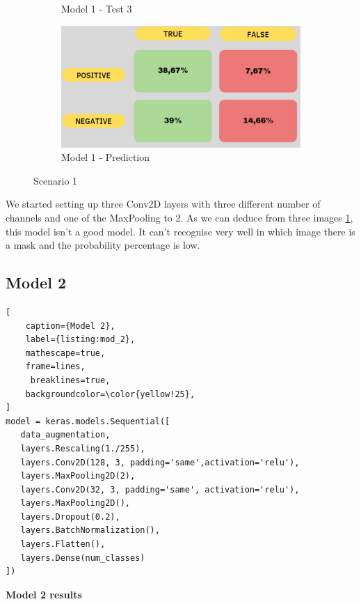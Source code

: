 \documentclass[a4paper,12pt]{article}
\begin{document}
\begin{figure}
\begin{subfigure}{6cm}
        \caption{ Model 1 - Test 3}
    \end{subfigure}
     \begin{subfigure}{6cm}
        \includegraphics[width=\linewidth]{images_latex/model1.jpg}
        \caption{ Model 1 - Prediction}
    \end{subfigure}
    \caption{Scenario 1}%
    \label{fig:mod_1_tests}
\end{figure}

We started setting up three Conv2D layers with three different number of channels and one of the MaxPooling to 2.
As we can deduce from three images \ref{fig:mod_1_tests}, this model isn't a good model. 
It can't recognise very well in which image there is a mask and the probability percentage is low. 
\newpage
\subsection{Model 2}
\begin{lstlisting}[
    caption={Model 2},
    label={listing:mod_2},
    mathescape=true, 
    frame=lines,
     breaklines=true,
    backgroundcolor=\color{yellow!25},
]
model = keras.models.Sequential([
   data_augmentation,
   layers.Rescaling(1./255), 
   layers.Conv2D(128, 3, padding='same',activation='relu'),
   layers.MaxPooling2D(2),
   layers.Conv2D(32, 3, padding='same', activation='relu'),
   layers.MaxPooling2D(),
   layers.Dropout(0.2),
   layers.BatchNormalization(), 
   layers.Flatten(),
   layers.Dense(num_classes)
])
\end{lstlisting}
    
\textbf{Model 2 results}
\end{document}

